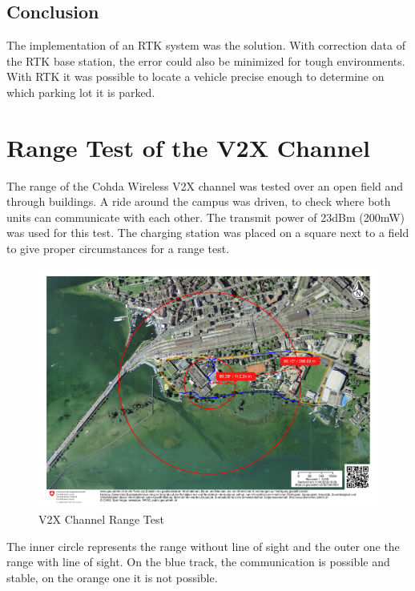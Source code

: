 \subsection*{Conclusion}

The implementation of an RTK system was the solution. With correction data of the RTK base station, the error could also be minimized for tough environments. With RTK it was possible to locate a vehicle precise enough to determine on which parking lot it is parked.

\section{Range Test of the V2X Channel}
The range of the Cohda Wireless V2X channel was tested over an open field and through buildings. A ride around the campus was driven, to check where both units can communicate with each other. The transmit power of 23\;dBm (200\;mW) was used for this test. The charging station was placed on a square next to a field to give proper circumstances for a range test.
\cite{CohdaWirelessETSA}

\begin{figure}[htb]
	\centering
	\includegraphics[width=1\textwidth]{images/rangetest}
	\caption{V2X Channel Range Test}
	\label{fig:rangetest}
\end{figure}

The inner circle represents the range without line of sight and the outer one the range with line of sight. On the blue track, the communication is possible and stable, on the orange one it is not possible.

